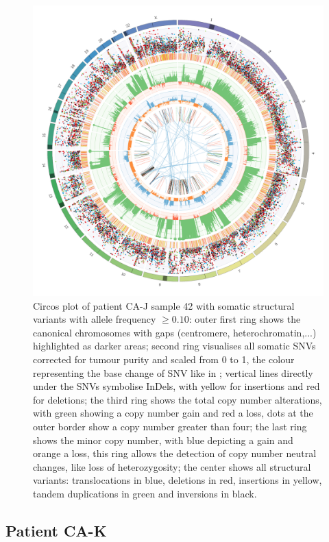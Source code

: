 \begin{figure}[ht]
\centering
\includegraphics[width=.99\linewidth]{Figures/CASCADE/CA80/CA80-42.circos.png}
\caption[Circos plot of patient CA-J sample 42]{Circos plot of patient CA-J sample 42 with somatic structural variants with allele frequency $\geq 0.10$: outer first ring shows the canonical chromosomes with gaps (centromere, heterochromatin,...) highlighted as darker areas; second ring visualises all somatic SNVs corrected for tumour purity and scaled from 0 to 1, the colour representing the base change of SNV like in \protect\textcite{Alexandrov2013}; vertical lines directly under the SNVs symbolise InDels, with yellow for insertions and red for deletions; the third ring shows the total copy number alterations, with green showing a copy number gain and red a loss, dots at the outer border show a copy number greater than four; the last ring shows the minor copy number, with blue depicting a gain and orange a loss, this ring allows the detection of copy number neutral changes, like loss of heterozygosity; the center shows all structural variants: translocations in blue, deletions in red, insertions in yellow, tandem duplications in green and inversions in black.} \label{fig:ca80.42circos}
\end{figure}

\cleardoublepage
\subsection{Patient CA-K}

